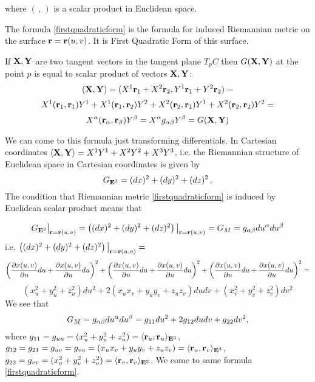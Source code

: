 \documentclass[12pt]{article}
\theoremstyle{theorem}
\numberwithin{equation}{section}
\begin{document}
where $(\,,\,)$ is a scalar product in Euclidean space.


The formula \eqref{firstquadraticform} is the formula for induced Riemannian
metric on the surface ${\bf r}={\bf r}(u,v)$. It is First Quadratic Form of this surface.

  If ${{\bf X},{\bf Y}}$ are two tangent vectors in the tangent plane $T_pC$ then $G({\bf X},{\bf Y})$
  at the point $p$ is equal to scalar product of vectors ${\bf X},{\bf Y}$:
\begin{equation}\label{scalarproduct}
({\bf X},{\bf Y})=(X^1{\bf r}_1+X^2{\bf r}_2, Y^1{\bf r}_1+Y^2{\bf r}_2)=
\end{equation}
                $$
X^1 ({\bf r}_1,{\bf r}_1)Y^1+X^1 ({\bf r}_1,{\bf r}_2)Y^2+X^2 ({\bf r}_2,{\bf r}_1)Y^1+X^2 ({\bf r}_2,{\bf r}_2)Y^2=
$$
$$X^\alpha ({\bf r}_\alpha,{\bf r}_\beta)Y^\beta=
X^\alpha g_{\alpha\beta}Y^\beta=G({\bf X},{\bf Y})
$$





We can come to this formula just transforming differentials.
 In Cartesian coordinates $\langle{\bf X},{\bf Y}\rangle=X^1Y^1+X^2Y^2+X^3Y^3$,
i.e. the  Riemannian structure of Euclidean space  in Cartesian coordinates is given by
           \begin{equation}\label{RiemEuclid}
            G_{{\bf E}^3}=(dx)^2+(dy)^2+(dz)^2\,.
           \end{equation}
The condition that Riemannian metric \eqref{firstquadraticform} is induced by Euclidean scalar product means
that

       \begin{equation}\label{intermsofdifferentials1}
        G_{{\bf E}^3}\big\vert_{{\bf r}={\bf r}(u,v)}=\left((dx)^2+(dy)^2+(dz)^2\right)\big\vert_{{\bf r}={\bf r}(u,v)}=
        G_M=g_{\alpha\beta}du^\alpha du^\beta
       \end{equation}
i.e.  $\left((dx)^2+(dy)^2+(dz)^2\right)\big\vert_{{\bf r}={\bf r}(u,v)}=$
          $$
\left({\partial x(u,v)\over \partial u}du+{\partial x(u,v)\over \partial u}du\right)^2+
\left({\partial x(u,v)\over \partial u}du+{\partial x(u,v)\over \partial u}du\right)^2+
\left({\partial x(u,v)\over \partial u}du+{\partial x(u,v)\over \partial u}du\right)^2=
          $$
          $$
(x_u^2+y_u^2+z_u^2)du^2+2(x_ux_v+y_uy_v+z_uz_v)dudv+(x_v^2+y_v^2+z_v^2)dv^2
          $$
          We see that
\begin{equation}\label{firstquadraticform1}
G_M=g_{\alpha\beta}du^\alpha du^\beta=g_{11}du^2+2g_{12}dudv+g_{22}dv^2,
\end{equation}
where $g_{11}=g_{uu}=(x_u^2+y_u^2+z_u^2)=\langle{\bf r}_u,{\bf r}_u\rangle_{{\bf E}^3}$,
$g_{12}=g_{21}=g_{uv}=g_{vu}=(x_ux_v+y_uy_v+z_uz_v)=\langle{\bf r}_u,{\bf r}_v\rangle_{{\bf E}^3}$,
$g_{22}=g_{vv}=(x_v^2+y_v^2+z_v^2)=\langle{\bf r}_v,{\bf r}_v\rangle_{{\bf E}^3}$.
We come to same formula \eqref{firstquadraticform}.
\end{document}
